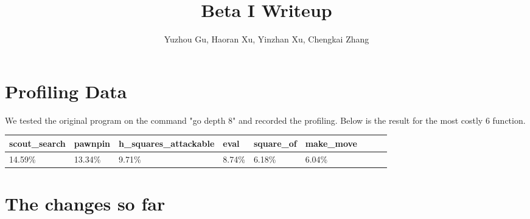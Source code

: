 \documentclass[10pt,twosidep]{article}
\begin{document}
\pagestyle{fancy}

\setlength{\parindent}{2em}
\setlength{\footskip}{30pt}
\setlength{\baselineskip}{1.3\baselineskip}

\title{Beta I Writeup}
\author{Yuzhou Gu, Haoran Xu, Yinzhan Xu, Chengkai Zhang}
\maketitle{}

\section{Profiling Data}

We tested the original program on the command "go depth 8" and recorded the profiling. Below is the result for the most costly 6 function. 

\begin{tabular}{ |l|l|l|l|l|l|l|l|l| }
\hline
scout\_search & pawnpin & h\_squares\_attackable & eval & square\_of & make\_move\\
\hline
 14.59\% & 13.34\% & 9.71\% & 8.74\% & 6.18\% & 6.04\%\\
 \hline
\end{tabular}

\section{The changes so far}
\end{document}
